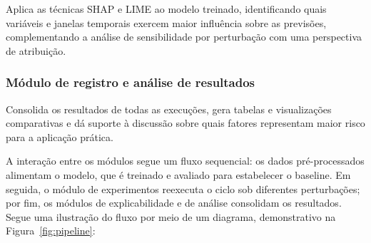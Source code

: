 \documentclass[
    12pt,                %
    openright,           %
    oneside,             %
    a4paper,             %
    english,             %
    brazil               %
]{abntex2}
\begin{document}
Aplica as técnicas SHAP e LIME ao modelo treinado, identificando quais variáveis e janelas temporais exercem maior influência sobre as previsões, complementando a análise de sensibilidade por perturbação com uma perspectiva de atribuição.

\subsubsection{Módulo de registro e análise de resultados}

Consolida os resultados de todas as execuções, gera tabelas e visualizações comparativas e dá suporte à discussão sobre quais fatores representam maior risco para a aplicação prática.

A interação entre os módulos segue um fluxo sequencial: os dados pré-processados alimentam o modelo, que é treinado e avaliado para estabelecer o baseline. Em seguida, o módulo de experimentos reexecuta o ciclo sob diferentes perturbações; por fim, os módulos de explicabilidade e de análise consolidam os resultados. Segue uma ilustração do fluxo por meio de um diagrama, demonstrativo na Figura~\ref{fig:pipeline}:
\end{document}
